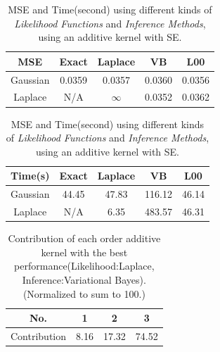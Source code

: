 \begin{table}[htp]
\centering
{\small
\begin{tabular}{|c|cccc|}
    \hline
	   \textbf{MSE} & Exact & Laplace & VB & L00 \\ 
    \hline
	   Gaussian & 0.0359 & 0.0357 & 0.0360 & \colorbox[rgb]{0.8,0.8,0.8}{0.0356} \\
	   Laplace & N/A & $\infty$ & \colorbox[rgb]{0.8,0.8,0.8}{0.0352} & 0.0362\\
    \hline
\end{tabular}

\begin{tabular}{|c|cccc|}
    \hline
	   \textbf{Time(s)} & Exact & Laplace & VB & L00 \\ 
    \hline
	   Gaussian & \colorbox[rgb]{0.8,0.8,0.8}{44.45} & 47.83 & 116.12 & 46.14 \\
	   Laplace & N/A & 6.35 & 483.57 & \colorbox[rgb]{0.8,0.8,0.8}{46.31} \\
    \hline
\end{tabular}
}
\caption{MSE and Time(second) using different kinds of \emph{Likelihood Functions} and \emph{Inference Methods}, using an additive kernel with SE.}
\label{tab:predict22}
\end{table}


\begin{table}[htp]
\centering
{\small
\begin{tabular}{|c|ccc|}
    \hline
	   No. & 1 & 2 & 3 \\ 
    \hline
	   Contribution & 8.16 & 17.32 & 74.52 \\ 
    \hline
\end{tabular}
}
\caption{Contribution of each order additive kernel with the best performance(Likelihood:Laplace, Inference:Variational Bayes). (Normalized to sum to 100.)}
\label{tab:contribution}
\end{table}



